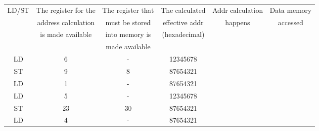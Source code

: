\documentclass[a4paper, 11pt]{exam}
\begin{document}
\begin{enumerate}
\begin{table}[h!]
	\begin{center}
		\begin{tabular}{|c|c|c|c|c|c|}
			\hline
			LD/ST & The register for the & The register that & The calculated & Addr calculation & Data memory \\
			& address calculation  & must be stored    & effective addr & happens          & accessed    \\
			& is made available    & into memory is    & (hexadecimal)  &                  &             \\
			&                      & made available    &                &                  &             \\
			\hline
			\hline
			LD    & 6                    & -                 & 12345678       &                  &             \\
			\hline
			ST    & 9                    & 8                 & 87654321       &                  &             \\
			\hline
			LD    & 1                    & -                 & 87654321       &                  &             \\
			\hline
			LD    & 5                    & -                 & 12345678       &                  &             \\
			\hline
			ST    & 23                   & 30                & 87654321       &                  &             \\
			\hline
			LD    & 4                    & -                 & 87654321       &                  &             \\
			\hline
		\end{tabular}
	\end{center}
\end{table}




\end{enumerate}
\end{document}
